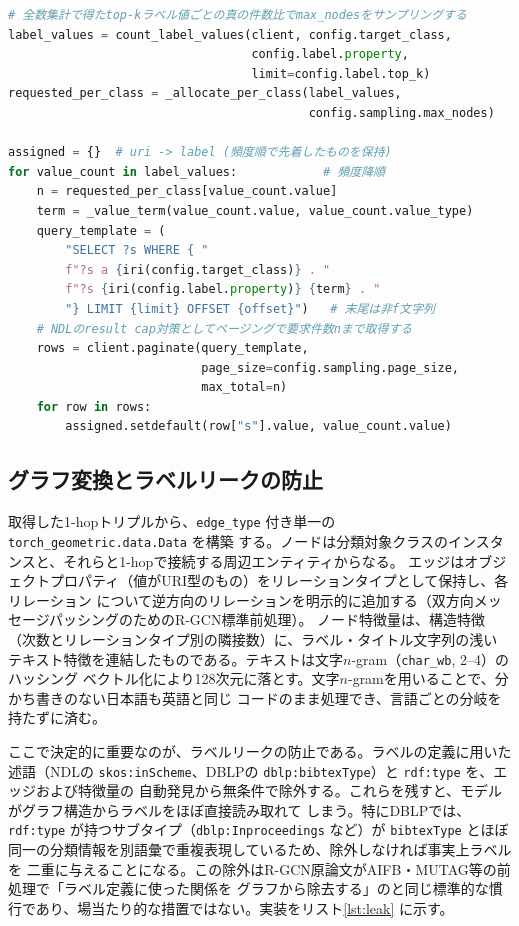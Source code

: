 \documentclass[dvipdfmx,twoside,11pt]{article}
\begin{document}
\begin{lstlisting}[language=Python, caption={ラベル値ごとの層化抽出（\texttt{rdf2graph/convert/labels.py}）。全数集計の真の比率でサンプリングし、層ごとにページングで取得する。}, label={lst:strat}]
# 全数集計で得たtop-kラベル値ごとの真の件数比でmax_nodesをサンプリングする
label_values = count_label_values(client, config.target_class,
                                  config.label.property,
                                  limit=config.label.top_k)
requested_per_class = _allocate_per_class(label_values,
                                          config.sampling.max_nodes)

assigned = {}  # uri -> label (頻度順で先着したものを保持)
for value_count in label_values:            # 頻度降順
    n = requested_per_class[value_count.value]
    term = _value_term(value_count.value, value_count.value_type)
    query_template = (
        "SELECT ?s WHERE { "
        f"?s a {iri(config.target_class)} . "
        f"?s {iri(config.label.property)} {term} . "
        "} LIMIT {limit} OFFSET {offset}")   # 末尾は非f文字列
    # NDLのresult cap対策としてページングで要求件数nまで取得する
    rows = client.paginate(query_template,
                           page_size=config.sampling.page_size,
                           max_total=n)
    for row in rows:
        assigned.setdefault(row["s"].value, value_count.value)
\end{lstlisting}

\subsection{グラフ変換とラベルリークの防止}

取得した1-hopトリプルから、\texttt{edge\_type} 付き単一の \texttt{torch\_geometric.data.Data} を構築
する。ノードは分類対象クラスのインスタンスと、それらと1-hopで接続する周辺エンティティからなる。
エッジはオブジェクトプロパティ（値がURI型のもの）をリレーションタイプとして保持し、各リレーション
について逆方向のリレーションを明示的に追加する（双方向メッセージパッシングのためのR-GCN標準前処理）。
ノード特徴量は、構造特徴（次数とリレーションタイプ別の隣接数）に、ラベル・タイトル文字列の浅い
テキスト特徴を連結したものである。テキストは文字$n$-gram（\texttt{char\_wb}, 2--4）のハッシング
ベクトル化により128次元に落とす。文字$n$-gramを用いることで、分かち書きのない日本語も英語と同じ
コードのまま処理でき、言語ごとの分岐を持たずに済む。

ここで決定的に重要なのが、ラベルリークの防止である。ラベルの定義に用いた述語（NDLの
\texttt{skos:inScheme}、DBLPの \texttt{dblp:bibtexType}）と \texttt{rdf:type} を、エッジおよび特徴量の
自動発見から無条件で除外する。これらを残すと、モデルがグラフ構造からラベルをほぼ直接読み取れて
しまう。特にDBLPでは、\texttt{rdf:type} が持つサブタイプ（\texttt{dblp:Inproceedings} など）が
\texttt{bibtexType} とほぼ同一の分類情報を別語彙で重複表現しているため、除外しなければ事実上ラベルを
二重に与えることになる。この除外はR-GCN原論文がAIFB・MUTAG等の前処理で「ラベル定義に使った関係を
グラフから除去する」のと同じ標準的な慣行であり、場当たり的な措置ではない。実装をリスト\ref{lst:leak}
に示す。
\end{document}
